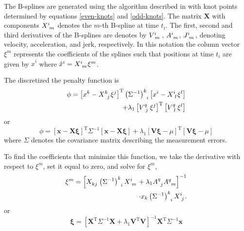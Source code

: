 \documentclass[10pt,journal]{IEEEtran}
\begin{document}
The B-splines are generated using the algorithm described in \cite{deboor1978-book} with knot points determined by equations \ref{even-knots} and \ref{odd-knots}. The matrix $\mathbf{X}$ with components $X\indices{^i_m}$ denotes the $m$-th B-spline at time $t_i$. The first, second and third derivatives of the B-splines are denotes by $V\indices{^i_m}$, $A\indices{^i_m}$, $J\indices{^i_m}$, denoting velocity, acceleration, and jerk, respectively. In this notation the column vector $\xi^m$ represents the coefficients of the splines such that positions at time $t_i$ are given by $\hat{x}^i$ where $\hat{x}^i =  X\indices{^i_m} \xi^m$.

The discretized the penalty function is
\begin{equation}
\begin{split}
\phi = \left[ x^k - X\indices{^k_j} \xi^j \right]^{\textrm{T}} \left(\Sigma^{-1}\right)\indices{^k_i} \left[ x^i - X\indices{^i_l} \xi^l \right] \\
+ \lambda_1 \left[V\indices{^q_j} \xi^j \right]^{\textrm{T}} \left[ V\indices{^q_l} \xi^l \right]
\end{split}
\end{equation}
or
\begin{equation}
\phi = \left[ \mathbf{x} - \mathbf{X} \mathbf{\xi} \right]^{\textrm{T}} \Sigma^{-1} \left[ \mathbf{x} - \mathbf{X} \mathbf{\xi}\right]
+ \lambda_1 \left[\mathbf{V}\mathbf{\xi} - \mu \right]^{\textrm{T}} \left[ \mathbf{V}\mathbf{\xi} - \mu \right]
\end{equation}
where $\Sigma$ denotes the covariance matrix describing the measurement errors.

To find the coefficients that minimize this function, we take the derivative with respect to $\xi^m$, set it equal to zero, and solve for $\xi^m$,
\begin{equation}
\begin{split}
\xi^m = \left[ X\indices{_k_j} \left(\Sigma^{-1}\right)\indices{^k_i}  X\indices{^i_m} + \lambda_1 {A}\indices{^q_j}{A}\indices{^q_m} \right]^{-1} \\
\cdot x_k \left(\Sigma^{-1}\right)\indices{^k_i}   X\indices{^i_j}.
\end{split}
\label{solution}
\end{equation}
or
\begin{equation}
\label{solution2}
\mathbf{\xi} = \left[ \mathbf{X}^{\textrm{T}} \Sigma^{-1} \mathbf{X} + \lambda_1 \mathbf{V}^{\textrm{T}} \mathbf{V} \right]^{-1} \mathbf{X}^{\textrm{T}} \Sigma^{-1} \mathbf{x}
\end{equation}
\end{document}
